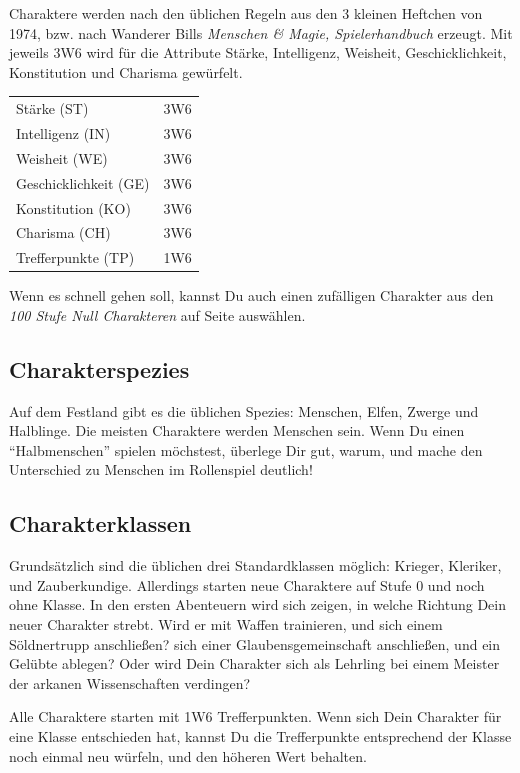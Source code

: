 \documentclass[11pt]{wbzine}
\begin{document}
\begin{multicols}{2}
Charaktere werden nach den üblichen Regeln aus den 3 kleinen
Heftchen von 1974, bzw. nach Wanderer Bills \textit{Menschen \&
Magie, Spielerhandbuch} erzeugt. Mit jeweils 3W6 wird für die
Attribute Stärke, Intelligenz, Weisheit, Geschicklichkeit,
Konstitution und Charisma gewürfelt.

\begin{tabularx}{\columnwidth}{Zc}
    Stärke (ST) & 3W6 \\
    Intelligenz (IN) & 3W6 \\
    Weisheit (WE) & 3W6 \\
    Geschicklichkeit (GE) & 3W6 \\
    Konstitution (KO) & 3W6 \\
    Charisma (CH) & 3W6 \\
    Trefferpunkte (TP) & 1W6 \\
\end{tabularx}

Wenn es schnell gehen soll, kannst Du auch einen zufälligen
Charakter aus den \textit{100 Stufe Null Charakteren} auf Seite
\pageref{100char} auswählen.

\subsection{Charakterspezies}

Auf dem Festland gibt es die üblichen Spezies: Menschen, Elfen,
Zwerge und Halblinge. Die meisten Charaktere werden Menschen sein.
Wenn Du einen ``Halbmenschen'' spielen möchstest, überlege Dir gut,
warum, und mache den Unterschied zu Menschen im Rollenspiel
deutlich!

\subsection{Charakterklassen}

Grundsätzlich sind die üblichen drei Standardklassen möglich:
Krieger, Kleriker, und Zauberkundige. Allerdings starten neue
Charaktere auf Stufe 0 und noch ohne Klasse. In den ersten
Abenteuern wird sich zeigen, in welche Richtung Dein neuer Charakter
strebt. Wird er mit Waffen trainieren, und sich einem Söldnertrupp
anschließen? sich einer Glaubensgemeinschaft anschließen, und ein
Gelübte ablegen? Oder wird Dein Charakter sich als Lehrling bei
einem Meister der arkanen Wissenschaften verdingen?

Alle Charaktere starten mit 1W6 Trefferpunkten. Wenn sich Dein
Charakter für eine Klasse entschieden hat, kannst Du die
Trefferpunkte entsprechend der Klasse noch einmal neu würfeln, und
den höheren Wert behalten.


\end{multicols}
\end{document}
